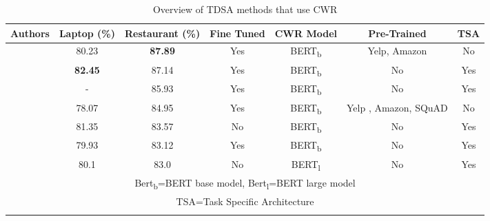 \begin{longtable}{|c|c|c|c|c|c|c|}
\hline
Authors & Laptop (\%) & Restaurant (\%) & Fine Tuned &  CWR Model & Pre-Trained & TSA \\
\hline
\cite{cwr_tdsa_models_rietzler2019adapt}   & 80.23 &  \textbf{87.89} &  Yes &  BERT\textsubscript{b} & Yelp, Amazon & No \\
\hline
\cite{cwr_tdsa_models_zeng2019lcf}   & \textbf{82.45} &  87.14 &  Yes &  BERT\textsubscript{b} & No & Yes \\
\hline
\cite{methods_jiang-etal-2019-challenge}   & - &  85.93 &  Yes &  BERT\textsubscript{b} & No & Yes \\
\hline
\cite{cwr_tdsa_models_xu-etal-2019-bert}   & 78.07 & 84.95  &  Yes &  BERT\textsubscript{b} & Yelp , Amazon, SQuAD & No \\
\hline
\cite{cwr_tdsa_models_zhaoa2019modeling}   & 81.35 &  83.57 &  No &  BERT\textsubscript{b} & No & Yes \\
\hline
\cite{cwr_tdsa_models_song2019attentional}   & 79.93 &  83.12 &  Yes &  BERT\textsubscript{b} & No & Yes \\
\hline
\cite{cwr_tdsa_models_huang2019syntax}   & 80.1 &  83.0 &  No &  BERT\textsubscript{l} & No & Yes \\
\hline
\multicolumn{7}{|c|}{Bert\textsubscript{b}=BERT base model, Bert\textsubscript{l}=BERT large model \cite{aug_devlin-etal-2019-bert}} \\
\multicolumn{7}{|c|}{TSA=Task Specific Architecture} \\
\hline
\caption{Overview of TDSA methods that use CWR}
\label{table:aug_cwr_tdsa_cwr_methods_overview}
\end{longtable}